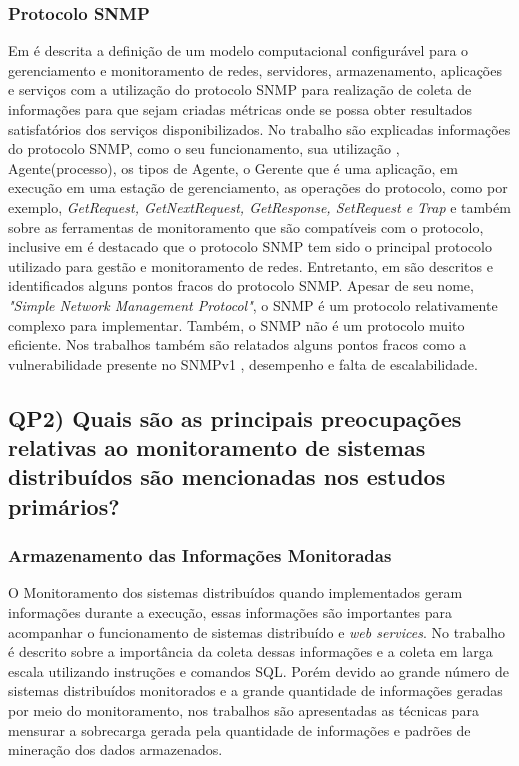 \subsubsection{Protocolo SNMP}
\label{snmpDescription}

Em \cite{deGeus} é descrita a definição de um modelo computacional configurável para o gerenciamento e monitoramento de redes, servidores, armazenamento, aplicações e serviços com a utilização do protocolo SNMP para realização de coleta de informações para que sejam criadas métricas onde se possa obter resultados satisfatórios dos serviços disponibilizados. No  trabalho \cite{daSilva} são explicadas informações do protocolo SNMP, como o seu funcionamento, sua utilização , Agente(processo), os tipos de Agente, o Gerente que é uma aplicação, em execução em uma estação de gerenciamento, as operações do protocolo, como por exemplo, \textit{GetRequest, 	GetNextRequest,  GetResponse,  SetRequest  e Trap} e também sobre as ferramentas de monitoramento que são compatíveis com o protocolo, inclusive em \cite{Fraga} é destacado que o protocolo SNMP tem sido o principal protocolo utilizado para gestão e monitoramento de redes. Entretanto, em \cite{deMello} são descritos e identificados alguns pontos fracos do protocolo \acrshort{SNMP}. Apesar  de  seu  nome,  \textit{"Simple  Network  Management  Protocol"},  o  SNMP  é  um protocolo  relativamente  complexo  para  implementar.  Também,  o  SNMP  não  é  um protocolo muito eficiente. Nos trabalhos \cite{phan2009cryptanalysis,subramanyan2000scalable} também são relatados alguns pontos fracos como a vulnerabilidade presente no SNMPv1 , desempenho e falta de escalabilidade.

\subsection{QP2) Quais são as principais preocupações relativas ao monitoramento de sistemas distribuídos são mencionadas nos estudos primários?}

\subsubsection{Armazenamento das Informações Monitoradas}

O Monitoramento dos sistemas distribuídos quando implementados geram informações durante a execução, essas informações são importantes para acompanhar o funcionamento de sistemas distribuído e \textit{web services}. No trabalho \cite{phan2009cryptanalysis} é descrito sobre a importância da coleta dessas informações e a coleta em larga escala utilizando instruções e comandos SQL. Porém devido ao grande número de sistemas distribuídos monitorados e a grande quantidade de informações geradas por meio do monitoramento, nos trabalhos \cite{abdu1996monitoring,hirate2009profiling} são apresentadas as técnicas para mensurar a sobrecarga gerada pela quantidade de informações e padrões de mineração dos dados armazenados.  

